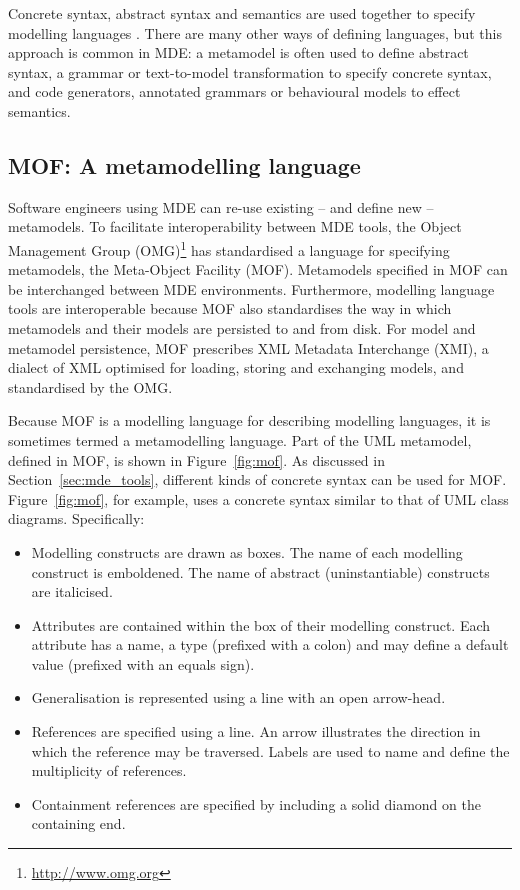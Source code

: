 Concrete \cc syntax, abstract syntax and semantics are used together to specify modelling languages \cite{alvarez01mml}. There are many other ways of defining languages, but this approach is common in MDE: a metamodel is often used to define abstract syntax, a grammar or text-to-model transformation to specify concrete syntax, and code generators, annotated grammars or behavioural models to effect semantics.

\subsection{MOF: A metamodelling language}
\label{subsec:mof}
Software engineers using MDE can re-use existing -- and define new -- metamodels. To facilitate interoperability between MDE tools, the Object Management Group (OMG)\footnote{\url{http://www.omg.org}} has standardised a language for specifying metamodels, the Meta-Object Facility (MOF). Metamodels specified in MOF can be interchanged between MDE environments. Furthermore, modelling language tools are interoperable because MOF also standardises the way in which metamodels and their models are persisted to and from disk. For model and metamodel persistence, MOF prescribes XML Metadata Interchange (XMI), a dialect of XML optimised for loading, storing and exchanging models, and standardised by the OMG.

Because MOF is a modelling language for describing modelling languages, it is sometimes termed a metamodelling language. Part of the UML metamodel, defined in MOF, is shown in Figure~\ref{fig:mof}. As discussed in Section~\ref{sec:mde_tools}, different kinds of concrete syntax can be used for MOF. Figure~\ref{fig:mof}, for example, uses a concrete syntax similar to that of UML class diagrams. Specifically:

\begin{itemize}
 \item Modelling constructs are drawn as boxes. The name of each modelling construct is emboldened. The name of abstract (uninstantiable) constructs are italicised.
 \item Attributes are contained within the box of their modelling construct. Each attribute has a name, a type (prefixed with a colon) and may define a default value (prefixed with an equals sign).
 \item Generalisation is represented using a line with an open arrow-head.
 \item References are specified using a line. An arrow illustrates the direction in which the reference may be traversed. Labels are used to name and define the multiplicity of references.
 \item Containment references are specified by including a solid diamond on the containing end.
\end{itemize}

